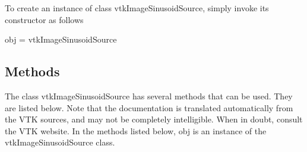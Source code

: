 To create an instance of class vtk\-Image\-Sinusoid\-Source, simply invoke its constructor as follows \begin{DoxyVerb}  obj = vtkImageSinusoidSource
\end{DoxyVerb}
 \hypertarget{vtkwidgets_vtkxyplotwidget_Methods}{}\subsection{Methods}\label{vtkwidgets_vtkxyplotwidget_Methods}
The class vtk\-Image\-Sinusoid\-Source has several methods that can be used. They are listed below. Note that the documentation is translated automatically from the V\-T\-K sources, and may not be completely intelligible. When in doubt, consult the V\-T\-K website. In the methods listed below, {\ttfamily obj} is an instance of the vtk\-Image\-Sinusoid\-Source class. 
